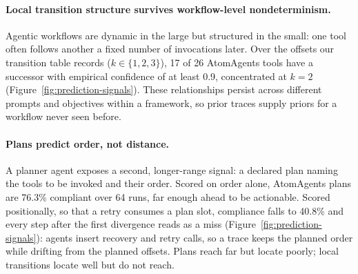 \paragraph{Local transition structure survives workflow-level nondeterminism.}
Agentic workflows are dynamic in the large but structured in the small: one
tool often follows another a fixed number of invocations later. Over the
offsets our transition table records ($k \in \{1,2,3\}$), 17 of 26 AtomAgents
tools have a successor with empirical confidence of at least 0.9, concentrated
at $k=2$ (Figure~\ref{fig:prediction-signals}). These relationships persist
across different prompts and objectives within a framework, so prior traces
supply priors for a workflow never seen before.

\paragraph{Plans predict order, not distance.}
A planner agent exposes a second, longer-range signal: a declared plan naming
the tools to be invoked and their order. Scored on order alone, AtomAgents
plans are 76.3\% compliant over 64 runs, far enough ahead to be actionable.
Scored positionally, so that a retry consumes a plan slot, compliance falls to
40.8\% and every step after the first divergence reads as a miss
(Figure~\ref{fig:prediction-signals}): agents insert recovery and retry calls,
so a trace keeps the planned order while drifting from the planned offsets.
Plans reach far but locate poorly; local transitions locate well but do not
reach.
